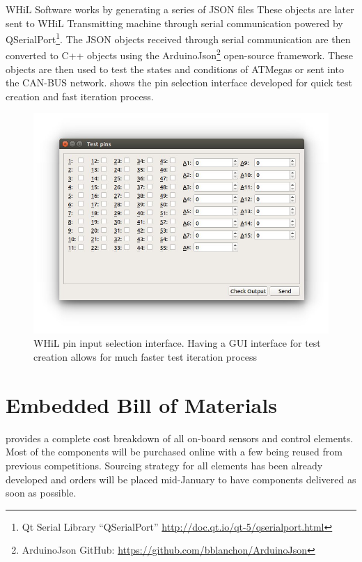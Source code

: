 \documentclass[main.tex]{subfiles}
\begin{document}
   WHiL Software works by generating a series of JSON files These objects are later sent to WHiL Transmitting machine through serial communication powered by QSerialPort\footnote{Qt Serial Library ``QSerialPort'' \url{http://doc.qt.io/qt-5/qserialport.html}}. The JSON objects received through serial communication are then converted to C++ objects using the ArduinoJson\footnote{ArduinoJson GitHub: \url{https://github.com/bblanchon/ArduinoJson}} open-source framework. These objects are then used to test the states and conditions of ATMegas or sent into the CAN-BUS network.  shows the pin selection interface developed for quick test creation and fast iteration process.
   
   \begin{figure}
        \centering
 		\includegraphics[width=\textwidth]{images/pin-testing.jpg}
		\caption{WHiL pin input selection interface. Having a GUI interface for test creation allows for much faster test iteration process}
        \label{fig:hil-pin-selection}
   \end{figure}
   
\section{Embedded Bill of Materials}
     provides a complete cost breakdown of all on-board sensors and control elements. Most of the components will be purchased online with a few being reused from previous competitions. Sourcing strategy for all elements has been already developed and orders will be placed mid-January to have components delivered as soon as possible.
    
\end{document}
